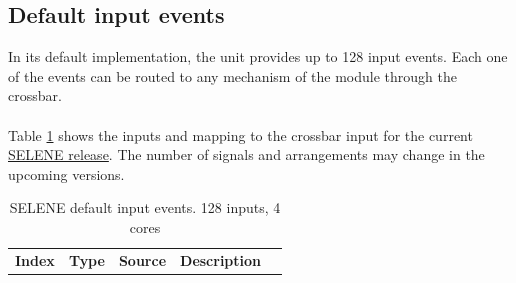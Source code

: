 \subsection{Default input events}
In its default implementation, the unit provides up to 128 input events. Each one of the events can be routed to any mechanism of the module through the crossbar.\\
\\
Table \ref{table:t_ev} shows the inputs and mapping to the crossbar input for the current \href{https://gitlab.bsc.es/selene/selene-hardware/-/merge_requests/2}{SELENE release}. The number of signals and arrangements may change in the upcoming versions. \\
\begin{table}[H]
	\caption{SELENE default input events. 128 inputs, 4 cores}
	\label{table:t_ev}
	\centering
	\begin{footnotesize}
	\begin{tabular}{|l|l|l|l|l|}
		\hline
		\textbf{Index} & \textbf{Type}  & \textbf{Source} & \textbf{Description} \\
	

\end{tabular}
\end{footnotesize}
\end{table}

